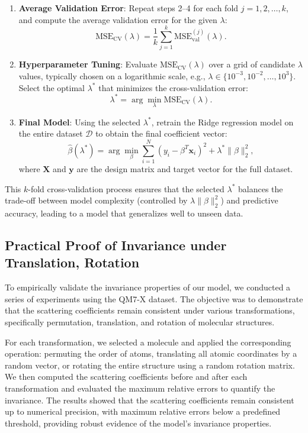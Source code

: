 \documentclass{article}
\begin{document}
\begin{enumerate}
    \item \textbf{Average Validation Error}: 
    Repeat steps 2–4 for each fold \(j = 1, 2, \ldots, k\), and compute the average validation error for the given \(\lambda\):
    \[
    \text{MSE}_{\text{CV}}(\lambda) = \frac{1}{k} \sum_{j=1}^k \text{MSE}_{\text{val}}^{(j)}(\lambda).
    \]

    \item \textbf{Hyperparameter Tuning}: 
    Evaluate \(\text{MSE}_{\text{CV}}(\lambda)\) over a grid of candidate \(\lambda\) values, typically chosen on a logarithmic scale, e.g., \(\lambda \in \{10^{-3}, 10^{-2}, \ldots, 10^3\}\). Select the optimal \(\lambda^*\) that minimizes the cross-validation error:
    \[
    \lambda^* = \arg\min_{\lambda} \text{MSE}_{\text{CV}}(\lambda).
    \]

    \item \textbf{Final Model}: 
    Using the selected \(\lambda^*\), retrain the Ridge regression model on the entire dataset \(\mathcal{D}\) to obtain the final coefficient vector:
    \[
    \hat{\beta}(\lambda^*) = \arg\min_{\beta} \sum_{i=1}^{N} \left( y_i - \beta^T \mathbf{x}_i \right)^2 + \lambda^* \|\beta\|_2^2,
    \]
    where \(\mathbf{X}\) and \(\mathbf{y}\) are the design matrix and target vector for the full dataset.
\end{enumerate}

This \(k\)-fold cross-validation process ensures that the selected \(\lambda^*\) balances the trade-off between model complexity (controlled by \(\lambda \|\beta\|_2^2\)) and predictive accuracy, leading to a model that generalizes well to unseen data.



\subsection{Practical Proof  of Invariance under Translation, Rotation}
To empirically validate the invariance properties of our model, we conducted a series of experiments using the QM7-X dataset. The objective was to demonstrate that the scattering coefficients remain consistent under various transformations, specifically permutation, translation, and rotation of molecular structures. \newline

For each transformation, we selected a molecule and applied the corresponding operation: permuting the order of atoms, translating all atomic coordinates by a random vector, or rotating the entire structure using a random rotation matrix. We then computed the scattering coefficients before and after each transformation and evaluated the maximum relative errors to quantify the invariance. The results showed that the scattering coefficients remain consistent up to numerical precision, with maximum relative errors below a predefined threshold, providing robust evidence of the model's invariance properties. \newline
\end{document}
